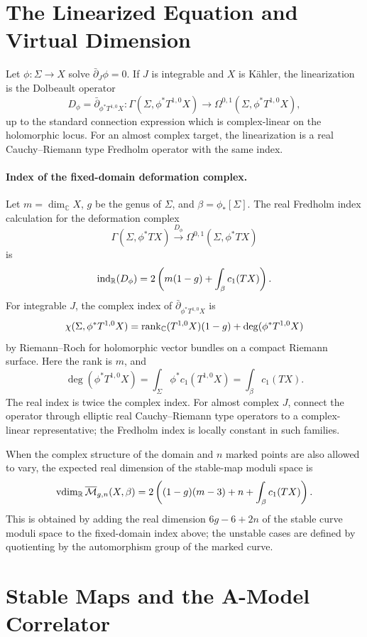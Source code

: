 \section{The Linearized Equation and Virtual Dimension}

Let \(\phi:\Sigma\to X\) solve \(\bar\partial_J\phi=0\).  If \(J\) is
integrable and \(X\) is K\"ahler, the linearization is the Dolbeault operator
\[
  D_\phi
  =
  \bar\partial_{\phi^\ast T^{1,0}X}
  :
  \Gamma(\Sigma,\phi^\ast T^{1,0}X)
  \longrightarrow
  \Omega^{0,1}(\Sigma,\phi^\ast T^{1,0}X),
\]
up to the standard connection expression which is complex-linear on the
holomorphic locus.  For an almost complex target, the linearization is a real
Cauchy--Riemann type Fredholm operator with the same index.

\paragraph{Index of the fixed-domain deformation complex.}
Let \(m=\dim_\mathbb C X\), \(g\) be the genus of \(\Sigma\), and
\(\beta=\phi_\ast[\Sigma]\).  The real Fredholm index calculation for the
deformation
complex
\[
  \Gamma(\Sigma,\phi^\ast TX)
  \xrightarrow{D_\phi}
  \Omega^{0,1}(\Sigma,\phi^\ast TX)
\]
is
\[
  {\rm ind}_{\mathbb R}(D_\phi)
  =
  2\left(m(1-g)+\int_\beta c_1(TX)\right).
\]
For integrable \(J\), the complex index of
\(\bar\partial_{\phi^\ast T^{1,0}X}\) is
\[
  \chi(\Sigma,\phi^\ast T^{1,0}X)
  =
  {\rm rank}_{\mathbb C}(T^{1,0}X)(1-g)
  +
  \deg(\phi^\ast T^{1,0}X)
\]
by Riemann--Roch for holomorphic vector bundles on a compact Riemann surface.
Here the rank is \(m\), and
\[
  \deg(\phi^\ast T^{1,0}X)
  =
  \int_\Sigma \phi^\ast c_1(T^{1,0}X)
  =
  \int_\beta c_1(TX).
\]
The real index is twice the complex index.  For almost complex \(J\), connect
the operator through elliptic real Cauchy--Riemann type operators to a
complex-linear representative; the Fredholm index is locally constant in such
families.

When the complex structure of the domain and \(n\) marked points are also
allowed to vary, the expected real dimension of the stable-map moduli space is
\[
  {\rm vdim}_{\mathbb R}\,\overline{\mathcal M}_{g,n}(X,\beta)
  =
  2\left((1-g)(m-3)+n+\int_\beta c_1(TX)\right).
\]
This is obtained by adding the real dimension \(6g-6+2n\) of the stable
curve moduli space to the fixed-domain index above; the unstable cases are
defined by quotienting by the automorphism group of the marked curve.

\section{Stable Maps and the A-Model Correlator}


